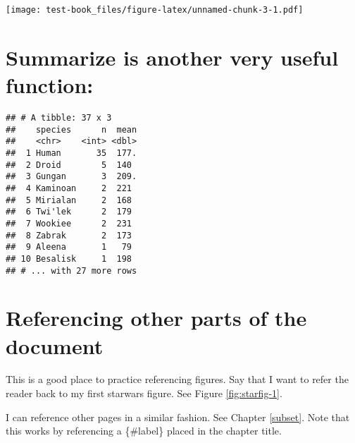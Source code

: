 \documentclass[]{book}
\newenvironment{Shaded}{\begin{snugshade}}{\end{snugshade}}
\newcommand{\DataTypeTok}[1]{\textcolor[rgb]{0.13,0.29,0.53}{#1}}
\newcommand{\KeywordTok}[1]{\textcolor[rgb]{0.13,0.29,0.53}{\textbf{#1}}}
\newcommand{\NormalTok}[1]{#1}
\newcommand{\OperatorTok}[1]{\textcolor[rgb]{0.81,0.36,0.00}{\textbf{#1}}}
\newcommand{\OtherTok}[1]{\textcolor[rgb]{0.56,0.35,0.01}{#1}}
\newcommand{\StringTok}[1]{\textcolor[rgb]{0.31,0.60,0.02}{#1}}
\begin{document}
\texttt{[image: test-book\_files/figure-latex/unnamed-chunk-3-1.pdf]}

\hypertarget{summarize-is-another-very-useful-function}{%
\section{Summarize is another very useful function:}\label{summarize-is-another-very-useful-function}}

\begin{Shaded}
\end{Shaded}

\begin{verbatim}
## # A tibble: 37 x 3
##    species      n  mean
##    <chr>    <int> <dbl>
##  1 Human       35  177.
##  2 Droid        5  140 
##  3 Gungan       3  209.
##  4 Kaminoan     2  221 
##  5 Mirialan     2  168 
##  6 Twi'lek      2  179 
##  7 Wookiee      2  231 
##  8 Zabrak       2  173 
##  9 Aleena       1   79 
## 10 Besalisk     1  198 
## # ... with 27 more rows
\end{verbatim}

\hypertarget{referencing-other-parts-of-the-document}{%
\section{Referencing other parts of the document}\label{referencing-other-parts-of-the-document}}

This is a good place to practice referencing figures. Say that I want to refer the reader back to my first starwars figure. See Figure \ref{fig:starfig-1}.

I can reference other pages in a similar fashion. See Chapter \ref{subset}. Note that this works by referencing a \{\#label\} placed in the chapter title.
\end{document}
